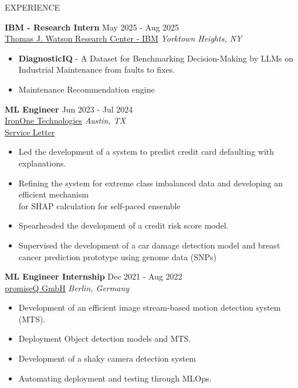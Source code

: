 \documentclass{resume} %
\begin{document}
\begin{rSection}{EXPERIENCE}

\textbf{IBM - Research Intern} \hfill May 2025 - Aug 2025\\
\href{https://research.ibm.com/labs/yorktown-heights}{Thomas J. Watson Research Center - IBM} \hfill \textit{Yorktown Heights, NY}
 \begin{itemize}
    \itemsep -3pt {} 
     \item \textbf{DiagnosticIQ} - A Dataset for Benchmarking Decision-Making by LLMs on Industrial Maintenance from faults to fixes.
     \item Maintenance Recommendation engine
 \end{itemize}

\textbf{ML Engineer} \hfill Jun 2023 - Jul 2024\\
\href{https://irononeailabs.com}{IronOne Technologies} \hfill \textit{Austin, TX} \\
\href{https://drive.google.com/file/d/18g-9RbiW1LLCa3f9J8CWWccwRikGCOnR/view?usp=sharing}{Service Letter}
 \begin{itemize}
    \itemsep -3pt {} 
     \item Led the development of a system to predict credit card defaulting with explanations.
     \item Refining the system for extreme class imbalanced data and developing an efficient mechanism \\ for SHAP calculation for self-paced ensemble
    \item Spearheaded the development of a credit risk score model.
    \item Supervised the development of a car damage detection model and breast cancer prediction prototype using genome data (SNPs)
 \end{itemize}
 
\textbf{ML Engineer Internship} \hfill Dec 2021 - Aug 2022\\
\href{https://www.promiseq.com}{promiseQ GmbH} \hfill \textit{Berlin, Germany}
 \begin{itemize}
    \itemsep -3pt {} 
     \item Development of an efficient image stream-based motion detection system (MTS).
     \item Deployment Object detection models and MTS.
     \item Development of a shaky camera detection system
     \item Automating deployment and testing through MLOps.
 \end{itemize}

\end{rSection} 
\end{document}
